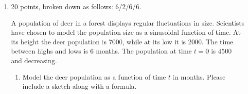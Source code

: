 \documentclass{article}
\begin{document}
\begin{enumerate}
\begin{enumerate}
\begin{multicols}{2}
\begin{enumerate}[label=\Alph*.]
      \item

      \end{enumerate}
      \end{multicols}
    

    \begin{solution}
      From {{{{\#4}}(a)}}, the equation
      $\displaystyle \sin^3(\pi x) + \sin(\pi x) \cos^2(\pi x) = -1$ has 3
      solutions on $[0, 2 \pi]$; this matches only graph D.  (Note
      that graph D looks like a sinusoid, which makes sense since we saw
      in {{{{\#4}}(a)}} that we could rewrite
      $\sin^3(\pi x) + \sin(\pi x) \cos^2(\pi x)$ as $\sin(\pi x)$.)

     The graph of $2 \sin^2 x - \sin x$ is B, since we found in \#4(a) that
     the equation $2 \sin^2 x - \sin x = 1$ has 3 solutions on $[0,2\pi]$

      So, our matching is . 
    \end{solution}
  \end{enumerate}

\item 

\begin{grading}
20 points, broken down as follows: 6/2/6/6.
\end{grading}


  A population of deer in a forest displays regular fluctuations in
  size. Scientists have chosen to model the population size as a
  sinusoidal function of time.  At its height the deer population is 7000,
  while at its low it is 2000. The time between highs and lows is 6
  months. The population at time $t=0$ is 4500 and decreasing.
  \begin{enumerate}

  \item
    \begin{problem}[\vfill\newpage]
      Model the deer population as a function of time $t$ in
      months. Please include a sketch along with a formula. 
    \end{problem}


\end{enumerate}
\end{enumerate}
\end{document}
